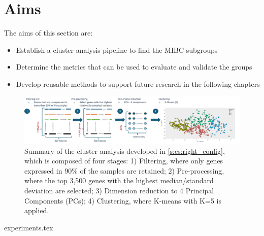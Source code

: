 
\section{Aims}

The aims of this section are:
\begin{itemize}
    \item Establish a cluster analysis pipeline to find the MIBC subgroups
    \item Determine the metrics that can be used to evaluate and validate the groups
    \item Develop reusable methods to support future research in the following chapters
\end{itemize}



\begin{figure}
    \centering
    \includegraphics[width=1.0\textwidth,height=1.0\textheight,keepaspectratio]{Sections/ClusteringAnalysis/Resources/clustering_pipeline.png}
    \caption[Cluster analysis pipeline]{Summary of the cluster analysis developed in \cref{s:cs:right_config}, which is composed of four stages: 1) Filtering, where only genes expressed in 90\% of the samples are retained; 2) Pre-processing, where the top 3,500 genes with the highest median/standard deviation are selected; 3) Dimension reduction to 4 Principal Components (PCs); 4) Clustering, where K-means with K=5 is applied.}
    \label{fig:cs:clustering_pipeline}
\end{figure}




{experiments.tex}

